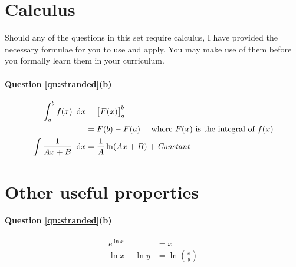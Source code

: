 \documentclass[11pt]{exam}
\begin{document}
	\begin{appendices}
		\section{Calculus}
		Should any of the questions in this set require calculus, I have provided the necessary formulae for you to use and apply. You may make use of them before you formally learn them in your curriculum.
		
		\paragraph{Question \ref{qn:stranded}(b)}
		\begin{align}
			\int_{a}^{b} f(x)~\dif x &= \left[F(x)\right]^{b}_{a} \notag \\
			&= F(b) - F(a) ~~~~ \text{where $F(x)$ is the integral of $f(x)$} \\
			\int \frac{1}{Ax + B} ~\dif x &= \frac{1}{A} \ln(Ax + B) + \text{\textit{Constant}}
		\end{align}
		\section{Other useful properties}
		\paragraph{Question \ref{qn:stranded}(b)}
		\begin{align*}
			e^{\ln x} &= x\\
			\ln x - \ln y &= \ln \left(\frac{x}{y}\right)
		\end{align*}
	\end{appendices}
\end{document}
